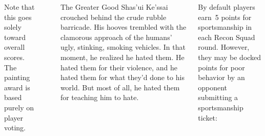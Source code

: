 \begin{columns}
Note that this goes solely toward overall scores.  The painting award
is based purely on player voting.

\columnbreak

\noindent{}\\

\begin{story}{0.75in}{The Greater Good}
  Shas'ui Ke'ssai crouched behind the crude rubble barricade.  His
  hooves trembled with the clamorous approach of the humans' ugly,
  stinking, smoking vehicles.  In that moment, he realized he hated
  them.  He hated them for their violence, and he hated them for what
  they'd done to his world.  But most of all, he hated them for
  teaching him to hate.
\end{story}%



By default players earn~5 points for sportsmanship in each Recon Squad
round.  However, they may be docked points for poor behavior by an
opponent submitting a sportsmanship ticket:


\end{columns}
